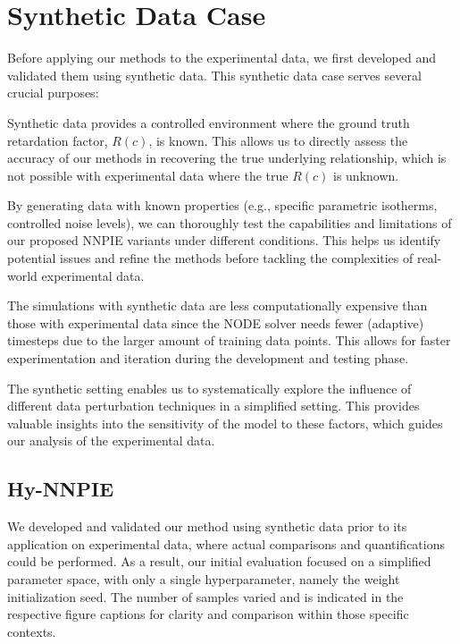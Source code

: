 \section{Synthetic Data Case}
Before applying our methods to the experimental data, we first developed and validated them using synthetic data. This synthetic data case serves several crucial purposes:
\begin{enumerate*}
    \item Synthetic data provides a controlled environment where the ground truth retardation factor, $R(c)$, is known. This allows us to directly assess the accuracy of our methods in recovering the true underlying relationship, which is not possible with experimental data where the true $R(c)$ is unknown.
    \item By generating data with known properties (e.g., specific parametric isotherms, controlled noise levels), we can thoroughly test the capabilities and limitations of our proposed NNPIE variants under different conditions. This helps us identify potential issues and refine the methods before tackling the complexities of real-world experimental data.
    \item The simulations with synthetic data are less computationally expensive than those with experimental data since the NODE solver needs fewer (adaptive) timesteps due to the larger amount of training data points. This allows for faster experimentation and iteration during the development and testing phase.
    \item The synthetic setting enables us to systematically explore the influence of different data perturbation techniques in a simplified setting. This provides valuable insights into the sensitivity of the model to these factors, which guides our analysis of the experimental data.
\end{enumerate*}

\subsection{Hy-NNPIE}
We developed and validated our method using synthetic data prior to its application on experimental data, where actual comparisons and quantifications could be performed. As a result, our initial evaluation focused on a simplified parameter space, with only a single hyperparameter, namely the weight initialization seed.
The number of samples varied and is indicated in the respective figure captions for clarity and comparison within those specific contexts.

